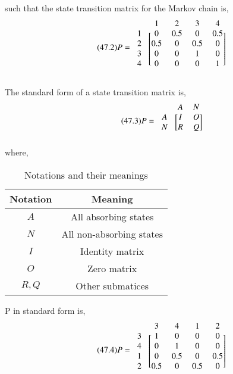 \documentclass[journal,12pt,twocolumn]{IEEEtran}
\begin{document}
\\such that the state transition matrix for the Markov chain is,
\begin{align}
\tag{47.2}
\label{eq:p}
    P=\begin{blockarray}{ccccc}
&1 & 2 & 3 & 4 \\
\begin{block}{c[cccc]}
  1 & 0 & 0.5 & 0 & 0.5 \\
  2 & 0.5 & 0 & 0.5 & 0  \\
  3 & 0 & 0 & 1 & 0 \\
  4 & 0 & 0 & 0 & 1\\
\end{block}
\end{blockarray}
\end{align}
\begin{definition}

The standard form of a state transition matrix is,
\begin{align}
\tag{47.3}
\label{eq:std}
    P=\begin{blockarray}{ccc}
&A & N \\
\begin{block}{c[cc]}
  A & I & O  \\
  N & R & Q \\
\end{block}
\end{blockarray}
\end{align}
where, 
\begin{table}[h!]
\centering
\caption{Notations and their meanings}
\label{table:2}
\begin{tabular}{|c|c|}
    \hline
    Notation & Meaning \\
    \hline
    $A$ & All absorbing states\\[1ex]
    \hline
    $N$ & All non-absorbing states\\[1ex]
    \hline
    $I$ & Identity matrix\\[1ex]
    \hline
    $O$ & Zero matrix\\[1ex]
    \hline
    $R,Q$ & Other submatices\\[1ex]
    \hline
\end{tabular}
\end{table}
\end{definition}
\begin{corollary}
P in standard form is, 
\begin{align}
\tag{47.4}
\label{eq:pstd}
    P=\begin{blockarray}{cccccc}
& 3 & 4 & 1 & 2 \\
\begin{block}{c[ccccc]}
  3 & 1 & 0 & 0 & 0 \\
  4 & 0 & 1 & 0 & 0 \\
  1 & 0 & 0.5 & 0 & 0.5  \\
  2 & 0.5 & 0 & 0.5 & 0  \\
\end{block}
\end{blockarray}
\end{align}
\end{corollary}
\end{document}
